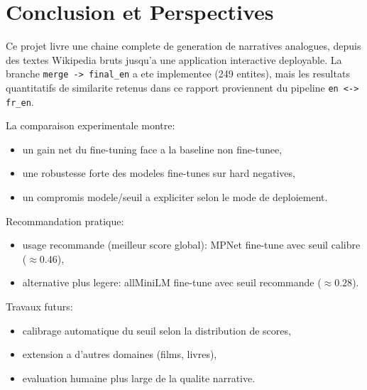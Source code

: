 ﻿\chapter{Conclusion et Perspectives}

Ce projet livre une chaine complete de generation de narratives analogues,
depuis des textes Wikipedia bruts jusqu'a une application interactive deployable.
La branche \texttt{merge -> final\_en} a ete implementee (249 entites), mais les
resultats quantitatifs de similarite retenus dans ce rapport proviennent du
pipeline \texttt{en <-> fr\_en}.

La comparaison experimentale montre:
\begin{itemize}[leftmargin=2em]
  \item un gain net du fine-tuning face a la baseline non fine-tunee,
  \item une robustesse forte des modeles fine-tunes sur hard negatives,
  \item un compromis modele/seuil a expliciter selon le mode de deploiement.
\end{itemize}

Recommandation pratique:
\begin{itemize}[leftmargin=2em]
  \item usage recommande (meilleur score global): MPNet fine-tune avec seuil calibre (\(\approx 0.46\)),
  \item alternative plus legere: allMiniLM fine-tune avec seuil recommande (\(\approx 0.28\)).
\end{itemize}

Travaux futurs:
\begin{itemize}[leftmargin=2em]
  \item calibrage automatique du seuil selon la distribution de scores,
  \item extension a d'autres domaines (films, livres),
  \item evaluation humaine plus large de la qualite narrative.
\end{itemize}
